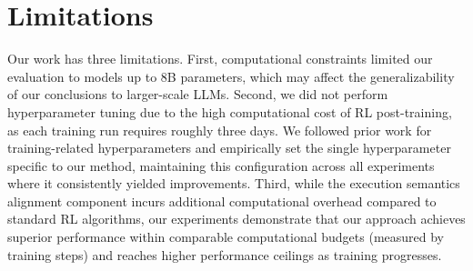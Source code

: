 \section{Limitations}
Our work has three limitations. First, computational constraints limited our evaluation to models up to 8B parameters, which may affect the generalizability of our conclusions to larger-scale LLMs. Second, we did not perform hyperparameter tuning due to the high computational cost of RL post-training, as each training run requires roughly three days. We followed prior work for training-related hyperparameters and empirically set the single hyperparameter specific to our method, maintaining this configuration across all experiments where it consistently yielded improvements. Third, while the execution semantics alignment component incurs additional computational overhead compared to standard RL algorithms, our experiments demonstrate that our approach achieves superior performance within comparable computational budgets (measured by training steps) and reaches higher performance ceilings as training progresses.
